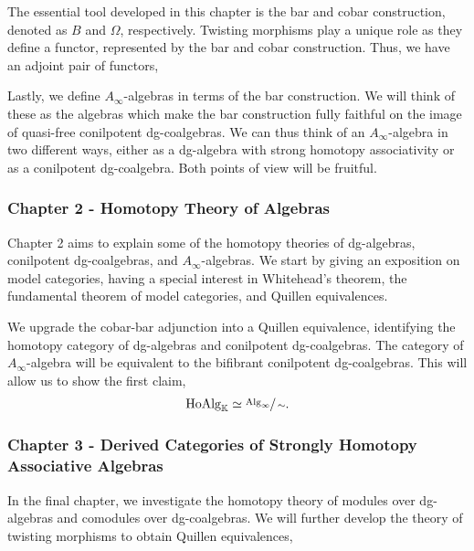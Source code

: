 \documentclass[../thesis.tex]{subfiles}
\begin{document}
            The essential tool developed in this chapter is the bar and cobar construction, denoted as $B$ and $\Omega$, respectively. Twisting morphisms play a unique role as they define a functor, represented by the bar and cobar construction. Thus, we have an adjoint pair of functors,
            \begin{center}
            \end{center}

            Lastly, we define $A_\infty$-algebras in terms of the bar construction. We will think of these as the algebras which make the bar construction fully faithful on the image of quasi-free conilpotent dg-coalgebras. We can thus think of an $A_\infty$-algebra in two different ways, either as a dg-algebra with strong homotopy associativity or as a conilpotent dg-coalgebra. Both points of view will be fruitful.

        \subsubsection*{Chapter 2 - Homotopy Theory of Algebras}
            Chapter 2 aims to explain some of the homotopy theories of dg-algebras, conilpotent dg-coalgebras, and $A_\infty$-algebras. We start by giving an exposition on model categories, having a special interest in Whitehead's theorem, the fundamental theorem of model categories, and Quillen equivalences.

            We upgrade the cobar-bar adjunction into a Quillen equivalence, identifying the homotopy category of dg-algebras and conilpotent dg-coalgebras. The category of $A_\infty$-algebra will be equivalent to the bifibrant conilpotent dg-coalgebras. This will allow us to show the first claim,
            \begin{align*}
                \text{HoAlg}_\mathbb{K} \simeq \sfrac{\text{Alg}_\infty}{\sim}\text{.}
            \end{align*}

        \subsubsection*{Chapter 3 - Derived Categories of Strongly Homotopy Associative Algebras}
            In the final chapter, we investigate the homotopy theory of modules over dg-algebras and comodules over dg-coalgebras. We will further develop the theory of twisting morphisms to obtain Quillen equivalences,
\end{document}

